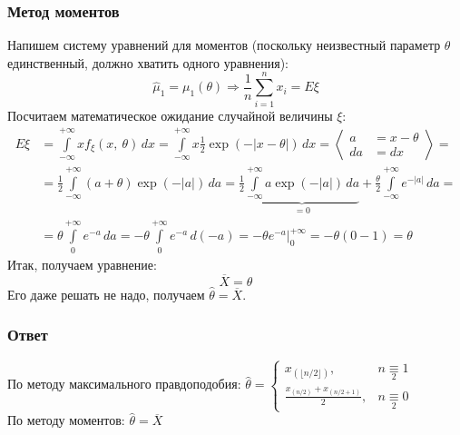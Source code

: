 \documentclass[12pt, a4paper]{article}
\begin{document}
\subsubsection*{Метод моментов}
Напишем систему уравнений для моментов (поскольку неизвестный параметр $\theta$ единственный, должно хватить одного уравнения):
\begin{equation*}
    \hat\mu_1 = \mu_1(\theta)\Rightarrow \frac{1}{n} \sum_{i = 1}^{n} x_i = E\xi
\end{equation*}
Посчитаем математическое ожидание случайной величины $\xi$:
\begin{equation*}
    \begin{aligned}
        E\xi & = \int\limits_{-\infty}^{+\infty} x f_{\xi}(x,\ \theta)\, dx = \int\limits_{-\infty}^{+\infty} x \frac{1}{2}\exp\left( -|x - \theta|\right)\, dx = \left< \begin{aligned}
                                                                                                                                                                             a  & = x - \theta \\
                                                                                                                                                                             da & = dx
                                                                                                                                                                         \end{aligned}  \right> =                                                   \\
             & = \frac{1}{2}\int\limits_{-\infty}^{+\infty} (a + \theta)\exp(-|a|)\, da = \frac{1}{2} \underset{=0}{\underbrace{\int\limits_{-\infty}^{+\infty}a\exp(-|a|)\, da}} + \frac{\theta}{2}\int\limits_{-\infty}^{+\infty} e^{-|a|}\, da = \\
             & = \theta \int\limits_{0}^{+\infty} e^{-a}\, da = -\theta \int\limits_0^{+\infty} e^{-a}\, d(-a) = -\theta e^{-a}\Big|_0^{+\infty} = -\theta (0 - 1) = \theta
    \end{aligned}
\end{equation*}
Итак, получаем уравнение:
\begin{equation*}
    \overline{X} = \theta
\end{equation*}
Его даже решать не надо, получаем $\hat\theta = \overline{X}$.\\
\subsubsection*{Ответ}
По методу максимального правдоподобия: $\hat \theta = \begin{cases}
        x_{(\lfloor n/2 \rfloor)},           & n\underset{2}{\equiv} 1 \\
        \frac{x_{(n/2)} + x_{(n/2 + 1)}}{2}, & n\underset{2}{\equiv} 0
    \end{cases}$\\
По методу моментов: $\hat \theta = \overline{X}$
\end{document}
